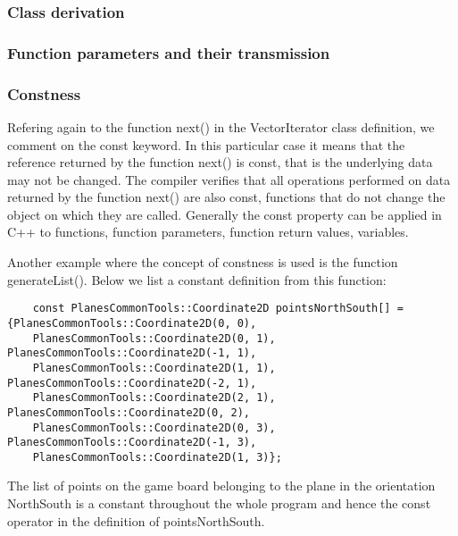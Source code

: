\subsubsection {Class derivation}
\subsubsection {Function parameters and their transmission}
\subsubsection {Constness}

Refering again to the function next() in the VectorIterator class definition, we comment on the const keyword. In this particular case it means that the reference returned by the function next() is const, that is the underlying data may not be changed. The compiler verifies that all operations performed on data returned by the function next() are also const, functions that do not change the object on which they are called. Generally the const property can be applied in C++ to functions, function parameters, function return values, variables. 

Another example where the concept of constness is used is the function generateList(). Below we list a constant definition from this function:

\begin{lstlisting}
    const PlanesCommonTools::Coordinate2D pointsNorthSouth[] = {PlanesCommonTools::Coordinate2D(0, 0), 
    PlanesCommonTools::Coordinate2D(0, 1), PlanesCommonTools::Coordinate2D(-1, 1),
    PlanesCommonTools::Coordinate2D(1, 1), PlanesCommonTools::Coordinate2D(-2, 1), 
    PlanesCommonTools::Coordinate2D(2, 1), PlanesCommonTools::Coordinate2D(0, 2),
    PlanesCommonTools::Coordinate2D(0, 3), PlanesCommonTools::Coordinate2D(-1, 3),
    PlanesCommonTools::Coordinate2D(1, 3)};
\end{lstlisting}

The list of points on the game board  belonging to the plane in the orientation NorthSouth is a constant throughout the whole program and hence the const operator in the definition of pointsNorthSouth.
